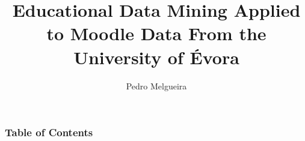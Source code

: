 \documentclass{beamer}
\title[]
{Educational Data Mining Applied to Moodle Data From the University of Évora}
\subtitle{}
\author[]
{Pedro Melgueira}
\institute[]{Universidade de Évora}
\begin{document}
\frame{\titlepage}

\begin{frame}
\frametitle{Table of Contents}
\tableofcontents[]
\end{frame}


\end{document}
